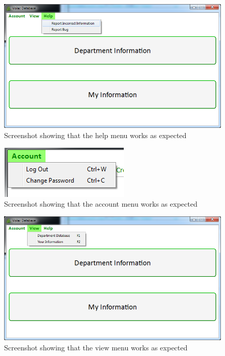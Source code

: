 \begin{figure}[H]
    \includegraphics[width=\textwidth]{./Testing/Images/HelpMenu.png}
    \caption{Screenshot showing that the help menu works as expected} \label{fig:HelpMenu}
\end{figure}

\begin{figure}[H]
    \includegraphics[width=\textwidth]{./Testing/Images/AccountMenu.png}
    \caption{Screenshot showing that the account menu works as expected} \label{fig:AccountMenu}
\end{figure}

\begin{figure}[H]
    \includegraphics[width=\textwidth]{./Testing/Images/ViewMenu.png}
    \caption{Screenshot showing that the view menu works as expected} \label{fig:ViewMenu}
\end{figure}


